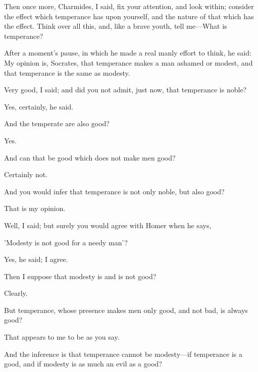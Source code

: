 \documentclass[11pt,letter]{article}
\begin{document}
\par  Then once more, Charmides, I said, fix your attention, and look within; consider the effect which temperance has upon yourself, and the nature of that which has the effect. Think over all this, and, like a brave youth, tell me—What is temperance?

\par  After a moment's pause, in which he made a real manly effort to think, he said: My opinion is, Socrates, that temperance makes a man ashamed or modest, and that temperance is the same as modesty.

\par  Very good, I said; and did you not admit, just now, that temperance is noble?

\par  Yes, certainly, he said.

\par  And the temperate are also good?

\par  Yes.

\par  And can that be good which does not make men good?

\par  Certainly not.

\par  And you would infer that temperance is not only noble, but also good?

\par  That is my opinion.

\par  Well, I said; but surely you would agree with Homer when he says,

\par  'Modesty is not good for a needy man'?

\par  Yes, he said; I agree.

\par  Then I suppose that modesty is and is not good?

\par  Clearly.

\par  But temperance, whose presence makes men only good, and not bad, is always good?

\par  That appears to me to be as you say.

\par  And the inference is that temperance cannot be modesty—if temperance is a good, and if modesty is as much an evil as a good?
\end{document}
